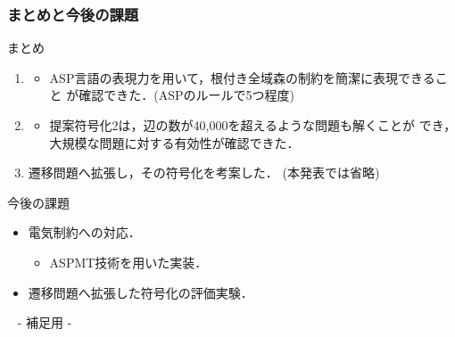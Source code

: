 \documentclass[dvipdfmx,11pt]{beamer}
\begin{document}
\begin{frame}\frametitle{まとめと今後の課題}
 \begin{block}{まとめ}
  \begin{enumerate}
   \item {}
   \begin{itemize}
	\item ASP言語の表現力を用いて，根付き全域森の制約を簡潔に表現できること
		  が確認できた．(ASPのルールで5つ程度)
   \end{itemize}
   \item {}
   \begin{itemize}
	\item 提案符号化2は，辺の数が40,000を超えるような問題も解くことが
		  でき，大規模な問題に対する有効性が確認できた．
   \end{itemize}
   \item 遷移問題へ拡張し，その符号化を考案した． (本発表では省略)
  \end{enumerate}
 \end{block}
 
 \begin{alertblock}{今後の課題}
  \begin{itemize}
   \item 電気制約への対応．
		 \begin{itemize}
		  \item ASPMT技術を用いた実装．
		 \end{itemize}
   \item 遷移問題へ拡張した符号化の評価実験．
  \end{itemize}
 \end{alertblock}
\end{frame}

\begin{frame}{~}
 \centering
 - 補足用 -
\end{frame} 
\end{document}
